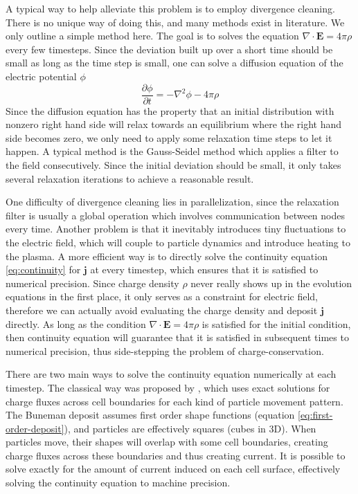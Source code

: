 A typical way to help alleviate this problem is to employ divergence
cleaning. There is no unique way of doing this, and many methods exist in
literature.  %
We only outline a simple method here. The goal is to solves the equation
$\nabla\cdot \mathbf{E} = 4\pi\rho$ every few timesteps. Since the deviation
built up over a short time should be small as long as the time step is small,
one can solve a diffusion equation of the electric potential $\phi$
\begin{equation}
  \label{eq:diffusion-electric-potential}
  \frac{\partial\phi}{\partial t} = -\nabla^2\phi - 4\pi\rho
\end{equation}
Since the diffusion equation has the property that an initial distribution with
nonzero right hand side will relax towards an equilibrium where the right hand
side becomes zero, we only need to apply some relaxation time steps to let it
happen. A typical method is the Gauss-Seidel method \citep[see
e.g.][]{press_numerical_2007} which applies a filter to the field consecutively.
Since the initial deviation should be small, it only takes several relaxation
iterations to achieve a reasonable result.

One difficulty of divergence cleaning lies in parallelization, since the
relaxation filter is usually a global operation which involves communication
between nodes every time. Another problem is that it inevitably introduces tiny
fluctuations to the electric field, which will couple to particle dynamics and
introduce heating to the plasma. A more efficient way is to directly solve the
continuity equation \eqref{eq:continuity} for $\mathbf{j}$ at every timestep,
which ensures that it is satisfied to numerical precision. Since charge density
$\rho$ never really shows up in the evolution equations in the first place, it
only serves as a constraint for electric field, therefore we can actually avoid
evaluating the charge density and deposit $\mathbf{j}$ directly.
As long as the condition $\nabla\cdot \mathbf{E} = 4\pi\rho$ is satisfied for
the initial condition, then continuity equation will guarantee that it is
satisfied in subsequent times to numerical precision, thus side-stepping the
problem of charge-conservation.

There are two main ways to solve the continuity equation numerically at each
timestep. The classical way was proposed by \citet{villasenor_rigorous_1992},
which uses exact solutions for charge fluxes across cell boundaries for each
kind of particle movement pattern. The Buneman deposit assumes first order shape
functions (equation \eqref{eq:first-order-deposit}), and particles are effectively
squares (cubes in 3D). When particles move, their shapes will overlap with some
cell boundaries, creating charge fluxes across these boundaries and thus
creating current. It is possible to solve exactly for the amount of current
induced on each cell surface, effectively solving the continuity equation to
machine precision.

